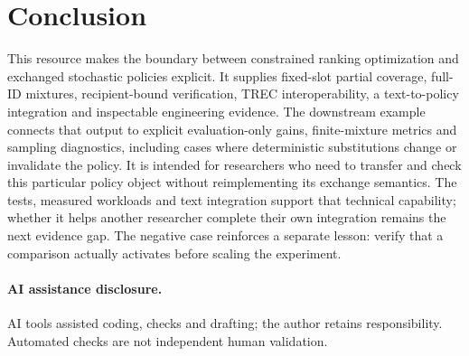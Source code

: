 \documentclass[runningheads]{llncs}
\begin{document}
\section{Conclusion}
This resource makes the boundary between constrained ranking optimization
and exchanged stochastic policies explicit. It supplies fixed-slot partial
coverage, full-ID mixtures, recipient-bound verification, TREC interoperability,
a text-to-policy integration and inspectable engineering evidence.
The downstream example connects that output to explicit evaluation-only gains,
finite-mixture metrics and sampling diagnostics, including cases where
deterministic substitutions change or invalidate the policy.
It is intended for researchers who need to transfer and check this particular
policy object without reimplementing its exchange semantics. The tests,
measured workloads and text integration support that technical capability;
whether it helps another researcher complete their own integration remains
the next evidence gap. The negative case reinforces a separate lesson:
verify that a comparison actually activates before scaling the experiment.

\paragraph{AI assistance disclosure.}
AI tools assisted coding, checks and drafting; the author retains responsibility.
Automated checks are not independent human validation.
\end{document}
